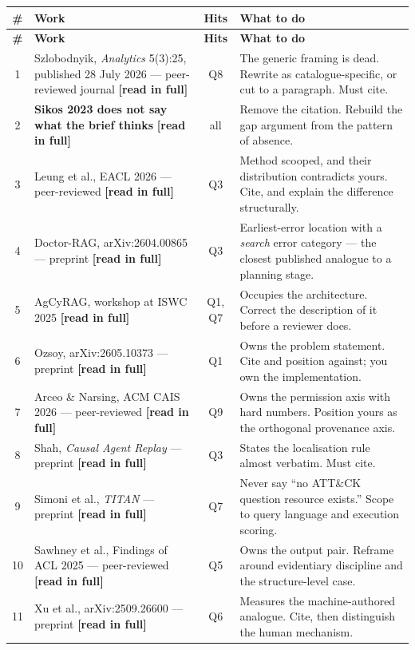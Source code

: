 \documentclass[11pt,a4paper]{article}
\newcommand{\readtag}{\textcolor{standing}{\textbf{[read in full]}}}
\begin{document}
\begin{center}
\footnotesize
\begin{longtable}{@{}c>{\RaggedRight}p{5.6cm}c>{\RaggedRight}p{6.4cm}@{}}
\toprule
\textbf{\#} & \textbf{Work} & \textbf{Hits} & \textbf{What to do} \\
\midrule
\endfirsthead
\toprule
\textbf{\#} & \textbf{Work} & \textbf{Hits} & \textbf{What to do} \\
\midrule
\endhead
1 & Szlobodnyik, \emph{Analytics} 5(3):25, published 28 July 2026 --- peer-reviewed journal \readtag & Q8 & The generic framing is dead. Rewrite as catalogue-specific, or cut to a paragraph. Must cite. \\
2 & \textbf{Sikos 2023 does not say what the brief thinks} \readtag & all & Remove the citation. Rebuild the gap argument from the pattern of absence. \\
3 & Leung et al., EACL 2026 --- peer-reviewed \readtag & Q3 & Method scooped, and their distribution contradicts yours. Cite, and explain the difference structurally. \\
4 & Doctor-RAG, arXiv:2604.00865 --- preprint \readtag & Q3 & Earliest-error location with a \emph{search} error category --- the closest published analogue to a planning stage. \\
5 & AgCyRAG, workshop at ISWC 2025 \readtag & Q1, Q7 & Occupies the architecture. Correct the description of it before a reviewer does. \\
6 & Ozsoy, arXiv:2605.10373 --- preprint \readtag & Q1 & Owns the problem statement. Cite and position against; you own the implementation. \\
7 & Arceo \& Narsing, ACM CAIS 2026 --- peer-reviewed \readtag & Q9 & Owns the permission axis with hard numbers. Position yours as the orthogonal provenance axis. \\
8 & Shah, \emph{Causal Agent Replay} --- preprint \readtag & Q3 & States the localisation rule almost verbatim. Must cite. \\
9 & Simoni et al., \emph{TITAN} --- preprint \readtag & Q7 & Never say ``no ATT\&CK question resource exists.'' Scope to query language and execution scoring. \\
10 & Sawhney et al., Findings of ACL 2025 --- peer-reviewed \readtag & Q5 & Owns the output pair. Reframe around evidentiary discipline and the structure-level case. \\
11 & Xu et al., arXiv:2509.26600 --- preprint \readtag & Q6 & Measures the machine-authored analogue. Cite, then distinguish the human mechanism. \\

\end{longtable}
\end{center}
\end{document}

